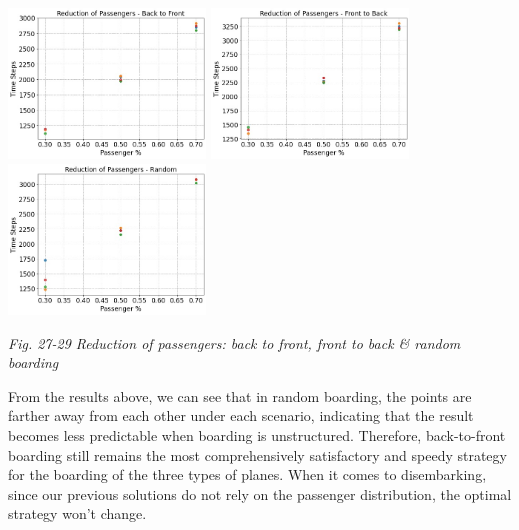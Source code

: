 \documentclass{article}
\theoremstyle{definition}
\theoremstyle{remark}
\numberwithin{equation}{section}
\begin{document}
	\begin{center}
		\includegraphics[height = 4cm]{reduce btf.jpg}
		\includegraphics[height = 4cm]{reduce ftb.jpg}
		\includegraphics[height = 4cm]{reduce random.jpg}

		\small\textit{Fig. 27-29 Reduction of passengers: back to front, front to back \& random boarding}
	\end{center}

	From the results above, we can see that in random boarding, the points are farther away from each other under each scenario, indicating that the result becomes less predictable when boarding is unstructured. Therefore, back-to-front boarding still remains the most comprehensively satisfactory and speedy strategy for the boarding of the three types of planes. When it comes to disembarking, since our previous solutions do not rely on the passenger distribution, the optimal strategy won't change.
\end{document}

